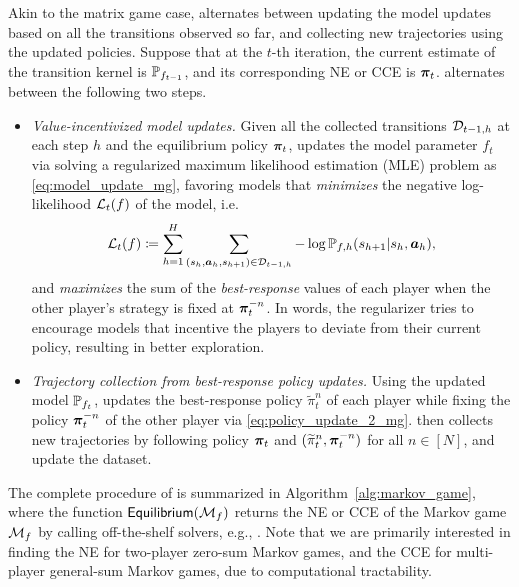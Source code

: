 Akin to the matrix game case, \name alternates between updating the model updates based on all the transitions observed so far, and collecting new trajectories using the updated policies.  Suppose that at the $t$-th iteration, the  current estimate of the transition kernel is ${\mathbb P}_{f_{t-1}}$, and its corresponding NE or CCE is ${\bm{\pi}}_t$. \name alternates between the following two steps.
\begin{itemize}
\item {\em Value-incentivized model updates.} Given all the collected transitions ${\mathcal{D}}_{t-1,h}$ at each step $h$ and the equilibrium policy ${\bm{\pi}}_t$, \name updates the model parameter $f_t$  via solving a regularized maximum likelihood estimation (MLE) problem as \eqref{eq:model_update_mg}, favoring models that {\em minimizes} the negative log-likelihood ${\mathcal{L}}_t(f)$ of the model, i.e.
\begin{align}\label{eq:loss_mg}
    {\mathcal{L}}_t(f)\coloneqq \sum_{h=1}^H\sum_{(s_h,{\bm{a}}_h,s_{h+1})\in{\mathcal{D}}_{t-1,h}}-\log {\mathbb P}_{f,h}(s_{h+1}|s_h,{\bm{a}}_h),
\end{align}
and {\em maximizes} the sum of the {\em best-response} values of each player when the other player's strategy is fixed at ${\bm{\pi}}_t^{-n}$. In words, the regularizer tries to encourage models that incentive the players to deviate from their current policy, resulting in better exploration. 

\item {\em Trajectory collection from best-response policy updates.} Using the updated model  ${\mathbb P}_{f_{t}}$, \name updates the best-response policy $\widetilde{\pi}_t^n$ of each player while fixing the policy ${\bm{\pi}}_t^{-n}$ of the other player via \eqref{eq:policy_update_2_mg}. \name then collects new trajectories by following policy ${\bm{\pi}}_t$ and $(\widetilde{\pi}_t^n,{\bm{\pi}}_t^{-n})$ for all $n\in [N]$, and update the dataset. 
\end{itemize}
The complete procedure of \name is summarized in Algorithm~\ref{alg:markov_game}, where the function $\mathsf{Equilibrium}({\mathcal{M}}_f)$ returns the NE or CCE of the Markov game ${\mathcal{M}}_f$ by calling off-the-shelf solvers, e.g., \citet{cai2024near,zhang2022policy}. Note that we are primarily interested in finding the NE for two-player zero-sum Markov games, and the CCE for multi-player general-sum Markov games, due to computational tractability.


 

